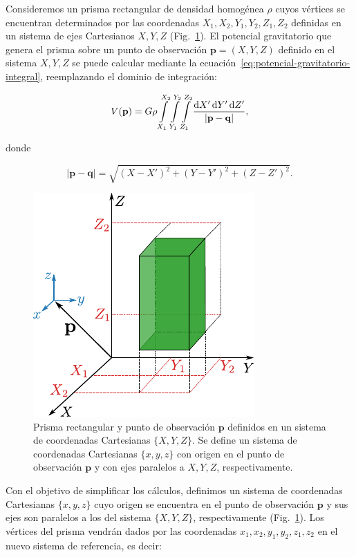 Consideremos un prisma rectangular de densidad homogénea $\rho$ cuyos vértices
se encuentran determinados por las coordenadas $X_1, X_2, Y_1, Y_2, Z_1, Z_2$
definidas en un sistema de ejes Cartesianos ${X, Y, Z}$
(Fig.~\ref{fig:rectangular-prism}).
El potencial gravitatorio que genera el prisma sobre un punto de observación
$\mathbf{p} = (X, Y, Z)$ definido en el sistema ${X, Y, Z}$ se puede
calcular mediante la ecuación~\ref{eq:potencial-gravitatorio-integral},
reemplazando el dominio de integración:

\begin{equation}
    V(\mathbf{p}) =
    G \rho
    \int\limits_{X_1}^{X_2}
    \int\limits_{Y_1}^{Y_2}
    \int\limits_{Z_1}^{Z_2}
    \frac{\mathop{}\!\textnormal{d} X' \mathop{}\!\textnormal{d} Y' \mathop{}\!\textnormal{d} Z'}{|\mathbf{p} - \mathbf{q}|},
\end{equation}

\noindent donde

\begin{equation}
    |\mathbf{p} - \mathbf{q}| = \sqrt{
        (X - X')^2 + (Y - Y')^2 + (Z - Z')^2
    }.
\end{equation}

\begin{figure}
    \centering
    \includegraphics[width=0.6\linewidth]{figs/rectangular-prism.pdf}
    \caption{
        Prisma rectangular y punto de observación $\mathbf{p}$ definidos en un
        sistema de coordenadas Cartesianas $\{X, Y, Z\}$. Se define un sistema
        de coordenadas Cartesianas $\{x, y, z\}$ con origen en el punto de
        observación $\mathbf{p}$ y con ejes paralelos a $X, Y, Z$,
        respectivamente.
    }
    \label{fig:rectangular-prism}
\end{figure}

Con el objetivo de simplificar los cálculos, definimos un sistema de
coordenadas Cartesianas $\{x, y, z\}$ cuyo origen se encuentra en el punto de
observación $\mathbf{p}$ y sus ejes son paralelos a los del sistema $\{X, Y,
Z\}$, respectivamente (Fig.~\ref{fig:rectangular-prism}).
Los vértices del prisma vendrán dados por las coordenadas
$x_1, x_2, y_1, y_2, z_1, z_2$ en el nuevo sistema de referencia, es decir:

